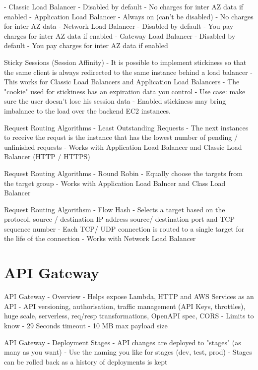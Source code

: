 - Classic Load Balancer
- Disabled by default
- No charges for inter AZ data if enabled
- Application Load Balancer
- Always on (can't be disabled)
- No charges for inter AZ data
- Network Load Balancer
- Disabled by default
- You pay charges for inter AZ data if enabled
- Gateway Load Balancer
- Disabled by default
- You pay charges for inter AZ data if enabled

Sticky Sessions (Session Affinity)
- It is possible to implement stickiness so that the same client is always redirected to the same instance behind a load balancer
- This works for Classic Load Balancers and Application Load Balancers
- The "cookie" used for stickiness has an expiration data you control
- Use case: make sure the user doesn't lose his session data
- Enabled stickiness may bring imbalance to the load over the backend EC2 instances.

Request Routing Algorithms - Least Outstanding Requests
- The next instances to receive the requst is the instance that has the lowest number of pending / unfinished requests
- Works with Application Load Balancer and Classic Load Balancer (HTTP / HTTPS)

Request Routing Algorithms - Round Robin
- Equally choose the targets from the target group
- Works with Application Load Balncer and Class Load Balancer

Request Routing Algorithsm - Flow Hash
- Selects a target based on the protocol, source / destination IP address source/ destination port and TCP sequence number
- Each TCP/ UDP connection is routed to a single target for the life of the connection
- Works with Network Load Balancer


\section{API Gateway}
API Gateway - Overview
- Helps expose Lambda, HTTP and AWS Services as an API
- API versioning, authorisation, traffic management (API Keys, throttles), huge scale, serverless, req/resp transformations, OpenAPI spec, CORS
- Limits to know
- 29 Seconds timeout
- 10 MB max payload size

API Gateway - Deployment Stages
- API changes are deployed to "stages" (as many as you want)
- Use the naming you like for stages (dev, test, prod)
- Stages can be rolled back as a history of deployments is kept


